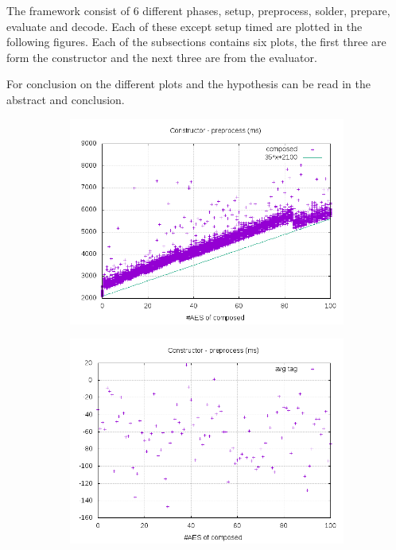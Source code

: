 \documentclass[10pt,a4paper]{article}
\begin{document}
The framework consist of 6 different phases, setup, preprocess, solder, prepare, evaluate and decode. Each of these except setup timed are plotted in the following figures. Each of the subsections contains six plots, the first three are form the constructor and the next three are from the evaluator.

For conclusion on the different plots and the hypothesis can be read in the abstract and conclusion.

\begin{figure}[h]
    \centering
    \begin{subfigure}[t]{0.3\textwidth}
        \includegraphics[width=\textwidth]{const_preprocess_plots}
        \caption{}
        \label{data const preprocess composed}
    \end{subfigure}
    \begin{subfigure}[t]{0.3\textwidth}
        \includegraphics[width=\textwidth]{const_preprocess_avg}

\end{subfigure}
\end{figure}
\end{document}
